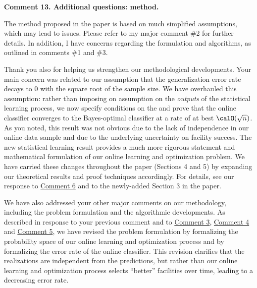 \documentclass[11pt]{article}
\begin{document}
\begin{commentBox}
    \textbf{Comment 13. Additional questions: method.}\label{R2:13}

    The method proposed in the paper is based on much simplified assumptions, which may lead to issues. Please refer to my major comment \#2 for further details. In addition, I have concerns regarding the formulation and algorithms, as outlined in comments \#1 and \#3.
\end{commentBox}

Thank you also for helping us strengthen our methodological developments. Your main concern was related to our assumption that the generalization error rate decays to 0 with the square root of the sample size. We have overhauled this assumption: rather than imposing on assumption on the \textit{outputs} of the statistical learning process, we now specify conditions on the  and prove that the online classifier converges to the Bayes-optimal classifier at a rate of at best $\calO(\sqrt n)$. As you noted, this result was not obvious due to the lack of independence in our online data sample and due to the underlying uncertainty on facility success. The new statistical learning result provides a much more rigorous statement and mathematical formulation of our online learning and optimization problem. We have carried these changes throughout the paper (Sections 4 and 5) by expanding our theoretical results and proof techniques accordingly. For details, see our response to \hyperref[R2:6]{\color{blue}Comment 6} and to the newly-added Section 3 in the paper.

We have also addressed your other major comments on our methodology, including the problem formulation and the algorithmic developments. As described in response to your previous comment and to \hyperref[R2:3]{\color{blue}Comment 3}, \hyperref[R2:4]{\color{blue}Comment 4} and \hyperref[R2:5]{\color{blue}Comment 5}, we have revised the problem formulation by formalizing the probability space of our online learning and optimization process and by formalizing the error rate of the online classifier. This revision clarifies that the realizations are independent from the predictions, but rather than our online learning and optimization process selects ``better'' facilities over time, leading to a decreasing error rate.
\end{document}
